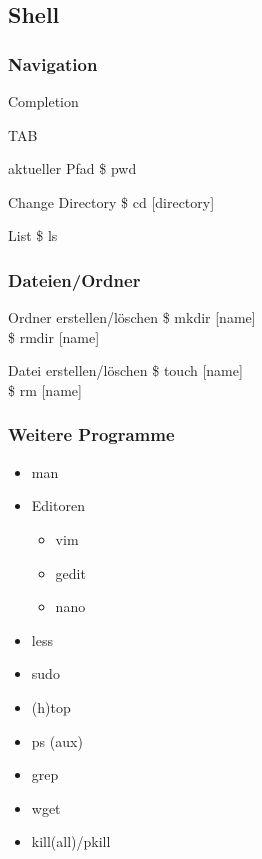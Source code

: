 \documentclass{beamer}
\begin{document}
    \subsection{Shell}
    \begin{frame}
        \frametitle{Navigation}
        \begin{block}{Completion}
            \begin{Huge}
                TAB
            \end{Huge}
        \end{block}
        \begin{block}{aktueller Pfad}
            \$ pwd
        \end{block}
        \begin{block}{Change Directory}
            \$ cd [directory]
        \end{block}
        \begin{block}{List}
            \$ ls
        \end{block}
    \end{frame}

    \begin{frame}
        \frametitle{Dateien/Ordner}
        \begin{block}{Ordner erstellen/l\"oschen}
            \$ mkdir [name] \\
            \$ rmdir [name]
        \end{block}
        \begin{block}{Datei erstellen/l\"oschen}
            \$ touch [name] \\
            \$ rm [name]
        \end{block}
    \end{frame}

    \begin{frame}
        \frametitle{Weitere Programme}
        \begin{itemize}
            \item man
            \item Editoren
            \begin{itemize}
                \item vim
                \item gedit
                \item nano
            \end{itemize}
            \item less
            \item sudo
            \item (h)top
            \item ps (aux)
            \item grep
            \item wget
            \item kill(all)/pkill
        \end{itemize}
    \end{frame}
\end{document}

